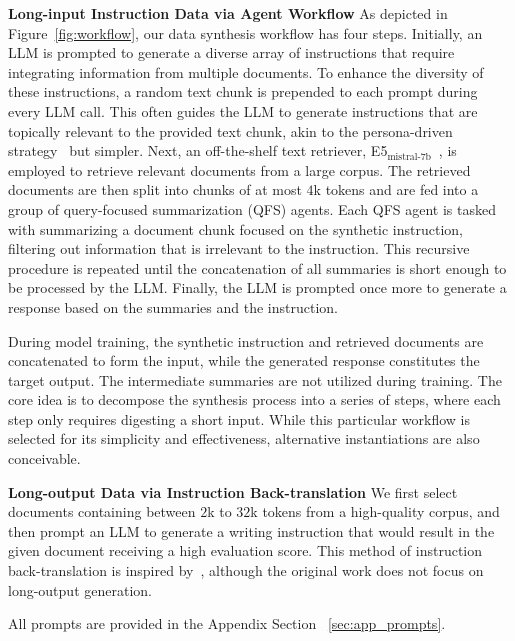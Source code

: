 \documentclass{article}
\begin{document}
\noindent
\textbf{Long-input Instruction Data via Agent Workflow}
As depicted in Figure~\ref{fig:workflow},
our data synthesis workflow has four steps.
Initially,
an LLM is prompted to generate a diverse array of instructions that require integrating information from multiple documents.
To enhance the diversity of these instructions,
a random text chunk is prepended to each prompt during every LLM call.
This often guides the LLM to generate instructions that are topically relevant to the provided text chunk,
akin to the persona-driven strategy~\citep{ge2024scaling} but simpler.
Next,
an off-the-shelf text retriever,
E5$_\text{mistral-7b}$~\citep{wang2023improving},
is employed to retrieve relevant documents from a large corpus.
The retrieved documents are then split into chunks of at most $4$k tokens
and are fed into a group of query-focused summarization (QFS) agents.
Each QFS agent is tasked with summarizing a document chunk focused on the synthetic instruction,
filtering out information that is irrelevant to the instruction.
This recursive procedure is repeated until the concatenation of all summaries is short enough to be processed by the LLM.
Finally,
the LLM is prompted once more to generate a response based on the summaries and the instruction.

During model training,
the synthetic instruction and retrieved documents are concatenated to form the input,
while the generated response constitutes the target output.
The intermediate summaries are not utilized during training.
The core idea is to decompose the synthesis process into a series of steps,
where each step only requires digesting a short input.
While this particular workflow is selected for its simplicity and effectiveness,
alternative instantiations are also conceivable.

\noindent
\textbf{Long-output Data via Instruction Back-translation}
We first select documents containing between $2$k to $32$k tokens from a high-quality corpus,
and then prompt an LLM to generate a writing instruction that would result in the given document receiving a high evaluation score.
This method of instruction back-translation is inspired by~\cite{li2023self},
although the original work does not focus on long-output generation.

All prompts are provided in the Appendix Section ~\ref{sec:app_prompts}.
\end{document}
